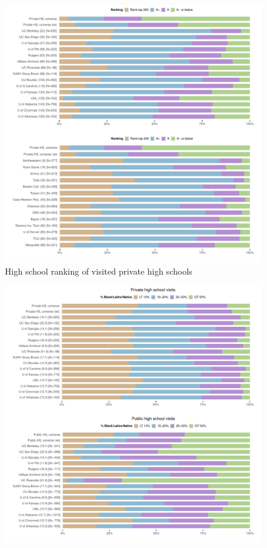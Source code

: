 \documentclass[
  12pt,
]{article}
\begin{document}
\begin{landscape}
\begin{figure}
{\centering \includegraphics[width=2\linewidth]{../assets/figures/ego_network_rank_pubu_privu} 

}

\caption{High school ranking of visited private high schools}\label{fig:rank-pubu-privu}
\end{figure}

\newpage

\begin{figure}

{\centering \includegraphics[width=2\linewidth]{../assets/figures/ego_network_race_pubu_privhs_pubhs} 

}
\end{figure}
\end{landscape}
\end{document}
